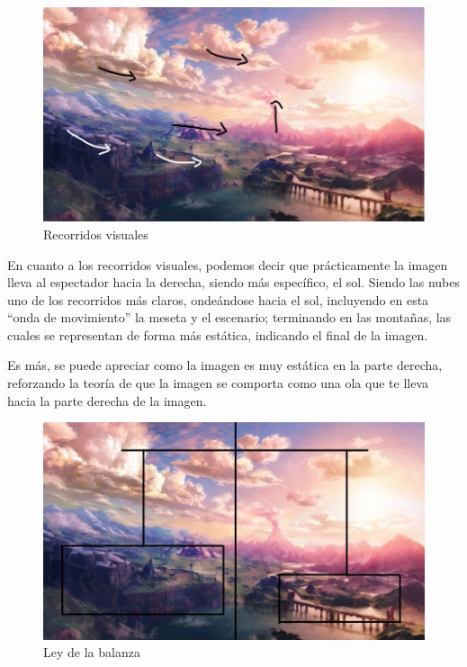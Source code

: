 \documentclass[12pt]{article}
\begin{document}
         \newpage
          \begin{figure}[H]
            \centering
            \includegraphics[scale = 0.4]{images/Jesus/Seccion2/Group 2.JPEG}
            \caption{Recorridos visuales}
          \end{figure}
          En cuanto a los recorridos visuales, podemos decir que prácticamente la imagen lleva al espectador hacia la derecha, siendo más específico, el sol. 
          Siendo las nubes uno de los recorridos más claros, ondeándose hacia el sol, incluyendo en esta “onda de movimiento” la meseta y el escenario; terminando en las montañas, las cuales se representan de forma más estática, indicando el final de la imagen. 

          Es más, se puede apreciar como la imagen es muy estática en la parte derecha, reforzando la teoría de que la imagen se comporta como una ola que te lleva hacia la parte derecha de la imagen.
          \newpage

          \begin{figure}[H]
            \centering
            \includegraphics[scale = 0.4]{Jesus/Seccion2/Group 6.JPEG}
            \caption{Ley de la balanza}
          \end{figure}
          
\end{document}
